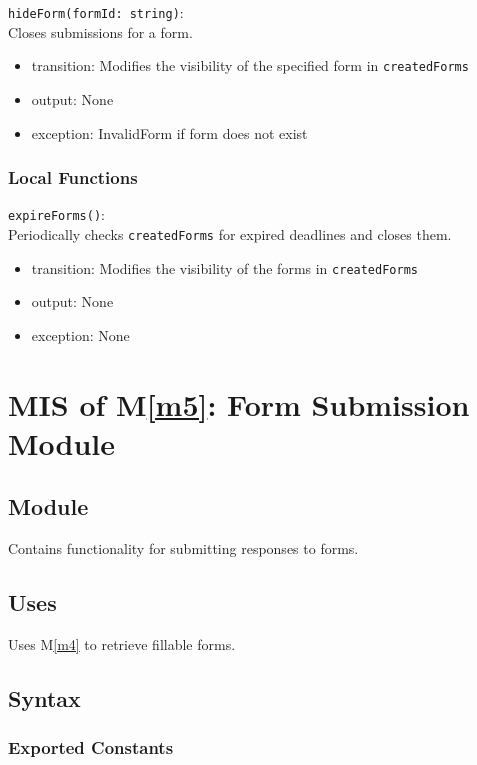 \documentclass[12pt, titlepage]{article}
\begin{document}
\noindent \texttt{hideForm(formId: string)}: \\
Closes submissions for a form.
\begin{itemize}
\item transition: Modifies the visibility of the specified form in \texttt{createdForms}
\item output: None
\item exception: InvalidForm if form does not exist
\end{itemize}

\subsubsection{Local Functions}

\noindent \texttt{expireForms()}: \\
Periodically checks \texttt{createdForms} for expired deadlines and closes them.
\begin{itemize}
\item transition: Modifies the visibility of the forms in \texttt{createdForms}
\item output: None
\item exception: None
\end{itemize}

\newpage

\section{MIS of M\ref{m5}: Form Submission Module}

\subsection{Module}

Contains functionality for submitting responses to forms.

\subsection{Uses}

Uses M\ref{m4} to retrieve fillable forms.

\subsection{Syntax}

\subsubsection{Exported Constants}
\end{document}
